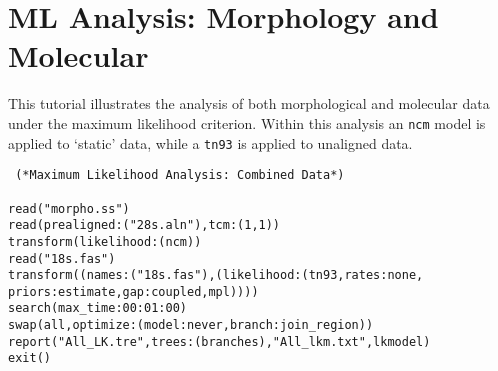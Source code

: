 
\section{ML Analysis: Morphology and Molecular}{\label{tutorial 18}}

This tutorial illustrates the analysis of both morphological and molecular 
data under the maximum likelihood criterion. Within this analysis an 
\texttt{ncm} model is applied to `static' data, while a \texttt{tn93} is 
applied to unaligned data. 

\begin{verbatim}
 (*Maximum Likelihood Analysis: Combined Data*) 

read("morpho.ss")
read(prealigned:("28s.aln"),tcm:(1,1))
transform(likelihood:(ncm))
read("18s.fas")
transform((names:("18s.fas"),(likelihood:(tn93,rates:none,
priors:estimate,gap:coupled,mpl))))
search(max_time:00:01:00)
swap(all,optimize:(model:never,branch:join_region))
report("All_LK.tre",trees:(branches),"All_lkm.txt",lkmodel)
exit()
\end{verbatim}

